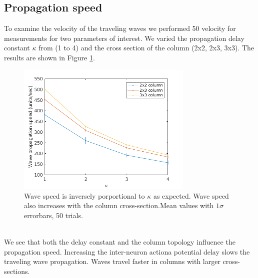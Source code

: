 \documentclass[a4paper,11pt]{article}
\begin{document}
\subsection{Propagation speed}
To examine the velocity of the traveling waves we performed 50 velocity for measurements for two parameters of interest.
We varied the propagation delay constant $\kappa$ from (1 to 4) and the cross section of the column (2x2, 2x3, 3x3).
The results are shown in Figure \ref{fig:delay_topology}.
\begin{figure}[!htb]
 \caption{Wave speed is inversely porportional to $\kappa$ as expected. Wave speed also increases with the column cross-section.Mean values with $1\sigma$ errorbars, 50 trials.}
 \label{fig:delay_topology}
 \centering
   \includegraphics[width=0.75\textwidth]{fig/WaveSpeed_DelayTopology}
\end{figure}
\\
We see that both the delay constant and the column topology influence the propagation speed.
Increasing the inter-neuron actiona potential delay slows the traveling wave propagation.
Waves travel faster in columns with larger cross-sections. 
\end{document}
